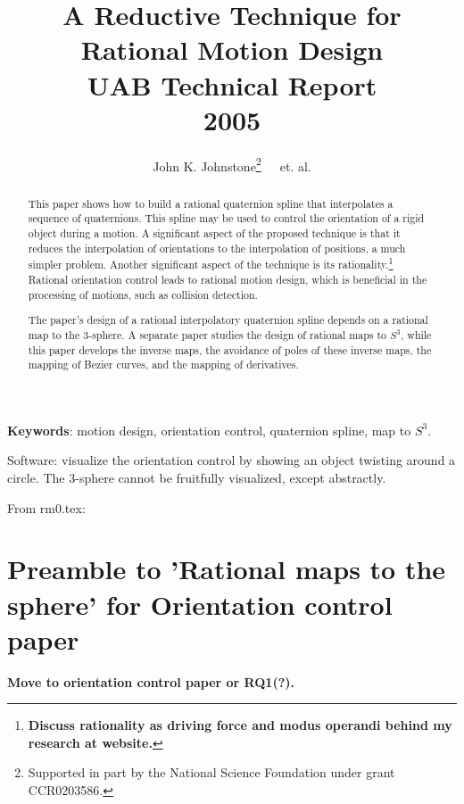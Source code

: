 \documentclass[12pt]{article}
\title{A Reductive Technique for Rational Motion Design\\[5pt]
       {\small UAB Technical Report\\2005}}
\author{John K. Johnstone\thanks{Supported in part by the National Science Foundation
        under grant CCR0203586.}\ \ \ et. al.}
\begin{document}
\maketitle

\begin{abstract}
This paper shows how to build a
rational quaternion spline that interpolates a sequence of quaternions.
This spline may be used to control the orientation of a rigid object during a motion.
A significant aspect of the proposed technique is 
that it reduces the interpolation of orientations
to the interpolation of positions, a much simpler problem.
Another significant aspect of the technique is its rationality.\footnote{{\bf Discuss 
    rationality as driving force and modus operandi behind my research at website.}}
Rational orientation control leads to rational motion design, which is beneficial
in the processing of motions, such as collision detection.

The paper's design of a rational interpolatory quaternion spline 
depends on a rational map to the 3-sphere.
A separate paper studies the design of rational maps to $S^3$, while
this paper develops the inverse maps, the avoidance of poles of these inverse maps,
the mapping of Bezier curves, and the mapping of derivatives.
\end{abstract}

{\bf Keywords}: motion design, orientation control, 
                quaternion spline, map to $S^3$.


\vspace{1in}

Software: visualize the orientation control by showing an object twisting around a circle.
          The 3-sphere cannot be fruitfully visualized, except abstractly.

\clearpage

\tableofcontents


\clearpage

From rm0.tex:

\section{Preamble to 'Rational maps to the sphere' for Orientation control paper}

{\bf Move to orientation control paper or RQ1(?).}
\end{document}
